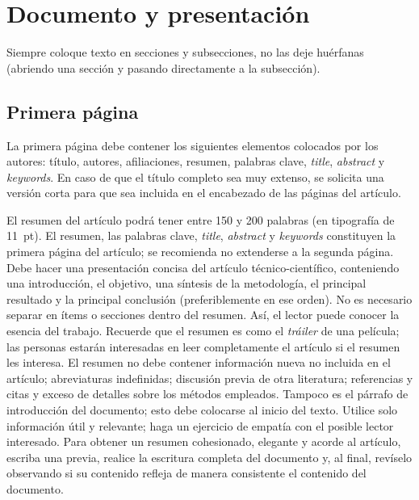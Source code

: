\section{Documento y presentación}

Siempre coloque texto en secciones y subsecciones, no las deje huérfanas (abriendo una sección y pasando directamente a la subsección).

\subsection{Primera página}

La primera página debe contener los siguientes elementos colocados por los autores: título, autores, afiliaciones, resumen, palabras clave, \textit{title}, \textit{abstract} y \textit{keywords}.
%
En caso de que el título completo sea muy extenso, se solicita una versión corta para que sea incluida en el encabezado de las páginas del artículo.

El resumen del artículo podrá tener entre 150 y 200 palabras (en tipografía de 11~pt). El resumen, las palabras clave, \textit{title}, \textit{abstract} y \textit{keywords} constituyen la primera página del artículo; se recomienda no extenderse a la segunda página.
Debe hacer una presentación concisa del artículo técnico-científico, conteniendo una introducción, el objetivo, una síntesis de la metodología, el principal resultado y la principal conclusión (preferiblemente en ese orden). No es necesario separar en ítems o secciones dentro del resumen. Así, el lector puede conocer la esencia del trabajo. Recuerde que el resumen es como el \textit{tráiler} de una película; las personas estarán interesadas en leer completamente el artículo si el resumen les interesa. El resumen no debe contener información nueva no incluida en el artículo; abreviaturas indefinidas; discusión previa de otra literatura; referencias y citas y exceso de detalles sobre los métodos empleados. Tampoco es el párrafo de introducción del documento; esto debe colocarse al inicio del texto. Utilice solo información útil y relevante; haga un ejercicio de empatía con el posible lector interesado. Para obtener un resumen cohesionado, elegante y acorde al artículo, escriba una previa, realice la escritura completa del documento y, al final, revíselo observando si su contenido refleja de manera consistente el contenido del documento.

